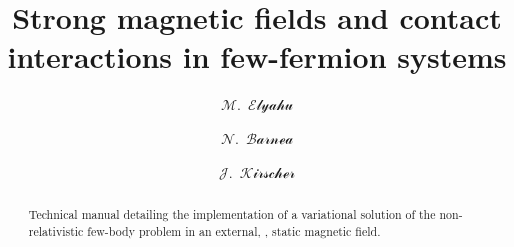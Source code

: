 \documentclass[aps,prd,onecolumn
,tightenlines,letterpaper,notitlepage,
nofootinbib]{revtex4-1}
\begin{document}
\author{$\mathcal{M}$.~$\mathcal{Elyahu}$}
\author{$\mathcal{N}$.~$\mathcal{Barnea}$}
\author{$\mathcal{J}$.~$\mathcal{Kirscher}$}

\title{
Strong magnetic fields and contact interactions in few-fermion systems
} 

\begin{abstract}
Technical manual detailing the implementation of a variational solution of the non-relativistic few-body
problem in an external, \ie, static magnetic field.
\end{abstract}

\pacs{}

\maketitle
\end{document}
